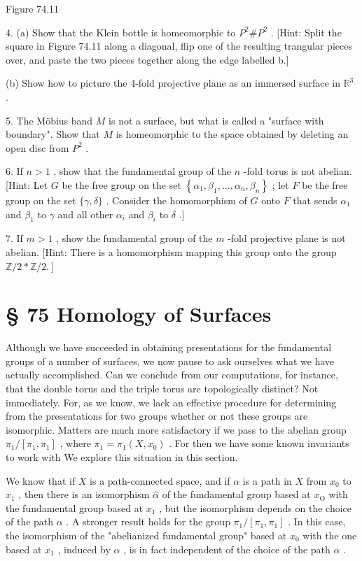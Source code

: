 \begin{theorem}
Figure 74.11

4. (a) Show that the Klein bottle is homeomorphic to \({P}^{2}\# {P}^{2}\) . [Hint: Split the square in Figure 74.11 along a diagonal, flip one of the resulting trangular pieces over, and paste the two pieces together along the edge labelled b.]

(b) Show how to picture the 4-fold projective plane as an immersed surface in \({\mathbb{R}}^{3}\) .

5. The Möbius band \(M\) is not a surface, but what is called a "surface with boundary". Show that \(M\) is homeomorphic to the space obtained by deleting an open disc from \({P}^{2}\) .

6. If \(n > 1\) , show that the fundamental group of the \(n\) -fold torus is not abelian. [Hint: Let \(G\) be the free group on the set \(\left\{  {{\alpha }_{1},{\beta }_{1},\ldots ,{\alpha }_{n},{\beta }_{n}}\right\}\) ; let \(F\) be the free group on the set \(\{ \gamma ,\delta \}\) . Consider the homomorphism of \(G\) onto \(F\) that sends \({\alpha }_{1}\) and \({\beta }_{1}\) to \(\gamma\) and all other \({\alpha }_{i}\) and \({\beta }_{i}\) to \(\delta\) .]

7. If \(m > 1\) , show the fundamental group of the \(m\) -fold projective plane is not abelian. [Hint: There is a homomorphism mapping this group onto the group \(\left. {\mathbb{Z}/2 * \mathbb{Z}/2.}\right\rbrack\)

\section*{§ 75 Homology of Surfaces}

Although we have succeeded in obtaining presentations for the fundamental groups of a number of surfaces, we now pause to ask ourselves what we have actually accomplished. Can we conclude from our computations, for instance, that the double torus and the triple torus are topologically distinct? Not immediately. For, as we know, we lack an effective procedure for determining from the presentations for two groups whether or not these groups are isomorphic. Matters are much more satisfactory if we pass to the abelian group \({\pi }_{1}/\left\lbrack  {{\pi }_{1},{\pi }_{1}}\right\rbrack\) , where \({\pi }_{1} = {\pi }_{1}\left( {X,{x}_{0}}\right)\) . For then we have some known invariants to work with We explore this situation in this section.

We know that if \(X\) is a path-connected space, and if \(\alpha\) is a path in \(X\) from \({x}_{0}\) to \({x}_{1}\) , then there is an isomorphism \(\widehat{\alpha }\) of the fundamental group based at \({x}_{\mathrm{O}}\) with the fundamental group based at \({x}_{1}\) , but the isomorphism depends on the choice of the path \(\alpha\) . A stronger result holds for the group \({\pi }_{1}/\left\lbrack  {{\pi }_{1},{\pi }_{1}}\right\rbrack\) . In this case, the isomorphism of the "abelianized fundamental group" based at \({x}_{0}\) with the one based at \({x}_{1}\) , induced by \(\alpha\) , is in fact independent of the choice of the path \(\alpha\) .


\end{theorem}
